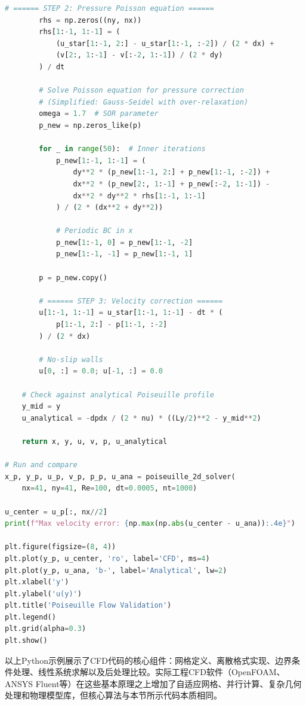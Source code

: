 \begin{lstlisting}[language=Python]
        # ====== STEP 2: Pressure Poisson equation ======
        rhs = np.zeros((ny, nx))
        rhs[1:-1, 1:-1] = (
            (u_star[1:-1, 2:] - u_star[1:-1, :-2]) / (2 * dx) +
            (v[2:, 1:-1] - v[:-2, 1:-1]) / (2 * dy)
        ) / dt
        
        # Solve Poisson equation for pressure correction
        # (Simplified: Gauss-Seidel with over-relaxation)
        omega = 1.7  # SOR parameter
        p_new = np.zeros_like(p)
        
        for _ in range(50):  # Inner iterations
            p_new[1:-1, 1:-1] = (
                dy**2 * (p_new[1:-1, 2:] + p_new[1:-1, :-2]) +
                dx**2 * (p_new[2:, 1:-1] + p_new[:-2, 1:-1]) -
                dx**2 * dy**2 * rhs[1:-1, 1:-1]
            ) / (2 * (dx**2 + dy**2))
            
            # Periodic BC in x
            p_new[1:-1, 0] = p_new[1:-1, -2]
            p_new[1:-1, -1] = p_new[1:-1, 1]
        
        p = p_new.copy()
        
        # ====== STEP 3: Velocity correction ======
        u[1:-1, 1:-1] = u_star[1:-1, 1:-1] - dt * (
            p[1:-1, 2:] - p[1:-1, :-2]
        ) / (2 * dx)
        
        # No-slip walls
        u[0, :] = 0.0; u[-1, :] = 0.0
    
    # Check against analytical Poiseuille profile
    y_mid = y
    u_analytical = -dpdx / (2 * nu) * ((Ly/2)**2 - y_mid**2)
    
    return x, y, u, v, p, u_analytical

# Run and compare
x_p, y_p, u_p, v_p, p_p, u_ana = poiseuille_2d_solver(
    nx=41, ny=41, Re=100, dt=0.0005, nt=1000)

u_center = u_p[:, nx//2]
print(f"Max velocity error: {np.max(np.abs(u_center - u_ana)):.4e}")

plt.figure(figsize=(8, 4))
plt.plot(y_p, u_center, 'ro', label='CFD', ms=4)
plt.plot(y_p, u_ana, 'b-', label='Analytical', lw=2)
plt.xlabel('y')
plt.ylabel('u(y)')
plt.title('Poiseuille Flow Validation')
plt.legend()
plt.grid(alpha=0.3)
plt.show()
\end{lstlisting}

\begin{remark}
以上Python示例展示了CFD代码的核心组件：网格定义、离散格式实现、边界条件处理、线性系统求解以及后处理比较。实际工程CFD软件（OpenFOAM、ANSYS Fluent等）在这些基本原理之上增加了自适应网格、并行计算、复杂几何处理和物理模型库，但核心算法与本节所示代码本质相同。
\end{remark}


